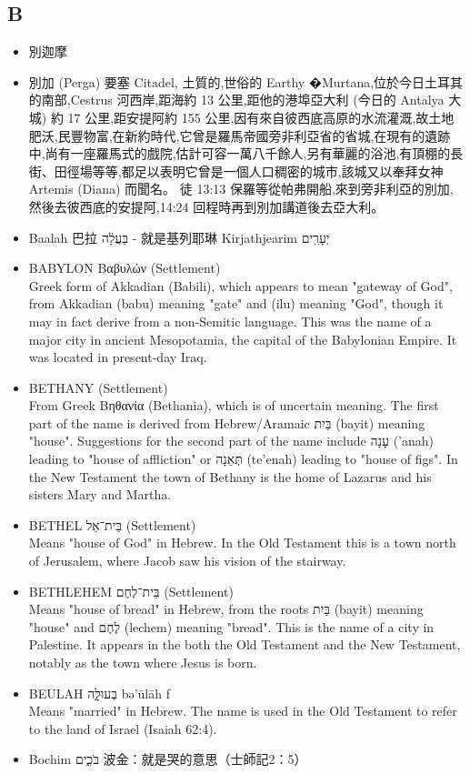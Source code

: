 \subsection{B}
\begin{itemize} 
\itemsep-.25em
\item 別迦摩
\item 別加 (Perga)
要塞 Citadel, 土質的,世俗的 Earthy �Murtana,位於今日土耳其的南部,Cestrus 河西岸,距海約 13 公里,距他的港埠亞大利 (今日的 Antalya 大城) 約 17 公里,距安提阿約 155 公里,因有來自彼西底高原的水流灌溉,故土地肥沃,民豐物富,在新約時代,它曾是羅馬帝國旁非利亞省的省城,在現有的遺跡中,尚有一座羅馬式的戲院,估計可容一萬八千餘人,另有華麗的浴池,有頂棚的長街、田徑場等等,都足以表明它曾是一個人口稠密的城市,該城又以奉拜女神 Artemis (Diana) 而聞名。
徒 13:13 保羅等從帕弗開船,來到旁非利亞的別加,然後去彼西底的安提阿,14:24 回程時再到別加講道後去亞大利。  
\item Baalah 巴拉 בַּעֲלָ֔ה - 就是基列耶琳 Kirjathjearim  יְעָרִֽים 
\item BABYLON Βαβυλών (Settlement) \\
Greek form of Akkadian (Babili), which appears to mean "gateway of God", from Akkadian (babu) meaning "gate" and (ilu) meaning "God", though it may in fact derive from a non-Semitic language. This was the name of a major city in ancient Mesopotamia, the capital of the Babylonian Empire. It was located in present-day Iraq.
\item BETHANY (Settlement) \\
From Greek Βηθανία (Bethania), which is of uncertain meaning. The first part of the name is derived from Hebrew/Aramaic בַּיִת (bayit) meaning "house". Suggestions for the second part of the name include עָנָה ('anah) leading to "house of affliction" or תְּאֵנָה (te'enah) leading to "house of figs". In the New Testament the town of Bethany is the home of Lazarus and his sisters Mary and Martha.
\item BETHEL בֵּית־אֵל (Settlement) \\
Means "house of God" in Hebrew. In the Old Testament this is a town north of Jerusalem, where Jacob saw his vision of the stairway.
\item BETHLEHEM בֵּית־לֶחֶם (Settlement) \\
Means "house of bread" in Hebrew, from the roots בַּיִת (bayit) meaning "house" and לֶחֶם (lechem) meaning "bread". This is the name of a city in Palestine. It appears in the both the Old Testament and the New Testament, notably as the town where Jesus is born.
\item BEULAH בְּעוּלָ֑ה bə'ūlāh f\\
Means "married" in Hebrew. The name is used in the Old Testament to refer to the land of Israel (Isaiah 62:4). 
\item Bochim  בֹּכִ֑ים  波金：就是哭的意思（士師記2：5）\\
\end{itemize} 

